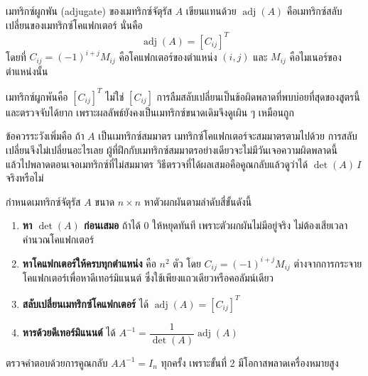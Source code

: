 \begin{definition}[เมทริกซ์ผูกพัน]
\label{def:adjugate}
เมทริกซ์ผูกพัน (adjugate) ของเมทริกซ์จัตุรัส $A$ เขียนแทนด้วย $\operatorname{adj}(A)$ คือเมทริกซ์สลับเปลี่ยนของเมทริกซ์โคแฟกเตอร์ นั่นคือ
\[ \operatorname{adj}(A) = [C_{ij}]^T \]
โดยที่ $C_{ij} = (-1)^{i+j} M_{ij}$ คือโคแฟกเตอร์ของตำแหน่ง $(i,j)$ และ $M_{ij}$ คือไมเนอร์ของตำแหน่งนั้น
\end{definition}

\begin{warning}
เมทริกซ์ผูกพันคือ $[C_{ij}]^T$ ไม่ใช่ $[C_{ij}]$ การลืมสลับเปลี่ยนเป็นข้อผิดพลาดที่พบบ่อยที่สุดของสูตรนี้ และตรวจจับได้ยาก เพราะผลลัพธ์ยังคงเป็นเมทริกซ์ขนาดเดิมจึงดูเผิน ๆ เหมือนถูก

ข้อควรระวังเพิ่มคือ ถ้า $A$ เป็นเมทริกซ์สมมาตร เมทริกซ์โคแฟกเตอร์จะสมมาตรตามไปด้วย การสลับเปลี่ยนจึงไม่เปลี่ยนอะไรเลย ผู้ที่ฝึกกับเมทริกซ์สมมาตรอย่างเดียวจะไม่มีวันเจอความผิดพลาดนี้ แล้วไปพลาดตอนเจอเมทริกซ์ที่ไม่สมมาตร วิธีตรวจที่ได้ผลเสมอคือคูณกลับแล้วดูว่าได้ $\det(A)\,I$ จริงหรือไม่
\end{warning}

\begin{principle}
\label{prin:inverse-steps}
กำหนดเมทริกซ์จัตุรัส $A$ ขนาด $n \times n$ หาตัวผกผันตามลำดับสี่ขั้นดังนี้

\begin{enumerate}
    \item \textbf{หา $\det(A)$ ก่อนเสมอ} ถ้าได้ 0 ให้หยุดทันที เพราะตัวผกผันไม่มีอยู่จริง ไม่ต้องเสียเวลาคำนวณโคแฟกเตอร์
    \item \textbf{หาโคแฟกเตอร์ให้ครบทุกตำแหน่ง} คือ $n^2$ ตัว โดย $C_{ij} = (-1)^{i+j}M_{ij}$ ต่างจากการกระจายโคแฟกเตอร์เพื่อหาดีเทอร์มิแนนต์ ซึ่งใช้เพียงแถวเดียวหรือคอลัมน์เดียว
    \item \textbf{สลับเปลี่ยนเมทริกซ์โคแฟกเตอร์} ได้ $\operatorname{adj}(A) = [C_{ij}]^T$
    \item \textbf{หารด้วยดีเทอร์มิแนนต์} ได้ $A^{-1} = \dfrac{1}{\det(A)}\operatorname{adj}(A)$
\end{enumerate}

ตรวจคำตอบด้วยการคูณกลับ $AA^{-1} = I_n$ ทุกครั้ง เพราะขั้นที่ 2 มีโอกาสพลาดเครื่องหมายสูง
\end{principle}

